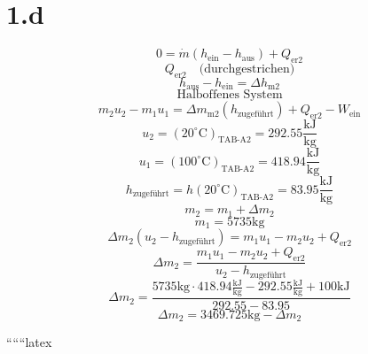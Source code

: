 \section*{1.d}
\[
0 = \dot{m} \left( h_{\text{ein}} - h_{\text{aus}} \right) + Q_{\text{er2}}
\]
\[
Q_{\text{er2}} \quad \text{(durchgestrichen)}
\]
\[
h_{\text{aus}} - h_{\text{ein}} = \Delta h_{\text{m2}}
\]
\[
\text{Halboffenes System}
\]
\[
m_2 u_2 - m_1 u_1 = \Delta m_{\text{m2}} \left( h_{\text{zugeführt}} \right) + Q_{\text{er2}} - W_{\text{ein}}
\]
\[
u_2 = \left( 20^\circ \text{C} \right)_{\text{TAB-A2}} = 292.55 \frac{\text{kJ}}{\text{kg}}
\]
\[
u_1 = \left( 100^\circ \text{C} \right)_{\text{TAB-A2}} = 418.94 \frac{\text{kJ}}{\text{kg}}
\]
\[
h_{\text{zugeführt}} = h \left( 20^\circ \text{C} \right)_{\text{TAB-A2}} = 83.95 \frac{\text{kJ}}{\text{kg}}
\]
\[
m_2 = m_1 + \Delta m_2
\]
\[
m_1 = 5735 \text{kg}
\]
\[
\Delta m_2 \left( u_2 - h_{\text{zugeführt}} \right) = m_1 u_1 - m_2 u_2 + Q_{\text{er2}}
\]
\[
\Delta m_2 = \frac{m_1 u_1 - m_2 u_2 + Q_{\text{er2}}}{u_2 - h_{\text{zugeführt}}}
\]
\[
\Delta m_2 = \frac{5735 \text{kg} \cdot 418.94 \frac{\text{kJ}}{\text{kg}} - 292.55 \frac{\text{kJ}}{\text{kg}} + 100 \text{kJ}}{292.55 - 83.95}
\]
\[
\Delta m_2 = 3469.725 \text{kg} - \Delta m_2
\]

``````latex


